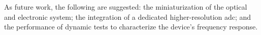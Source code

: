 \documentclass[sensors,article,accept,pdftex,moreauthors]{Definitions/mdpi}
\begin{document}
As future work, the following are suggested: the miniaturization of the optical and electronic system; the integration of a dedicated higher-resolution \gls{adc}; and the performance of dynamic tests to characterize the device's frequency response.





\end{document}
